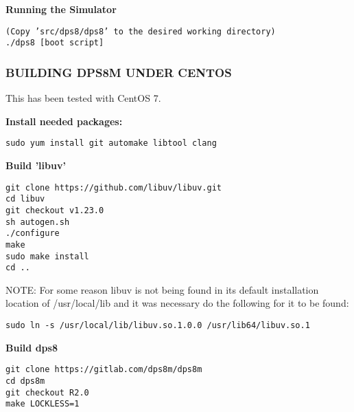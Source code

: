 \textbf{Running the Simulator}

\begin{adjustwidth}{5ex}{1ex}
    \texttt{(Copy 'src/dps8/dps8' to the desired working directory)} \\
    \texttt{./dps8 [boot script]} \\
\end{adjustwidth}  

\newpage

\subsubsection[Building dps8m under CentOS]{BUILDING DPS8M UNDER CENTOS}

This has been tested with CentOS 7.

\textbf{Install needed packages:}

\begin{adjustwidth}{5ex}{1ex}
	\texttt{sudo yum install git automake libtool clang} \\
\end{adjustwidth}  

\textbf{Build 'libuv'}

\begin{adjustwidth}{5ex}{1ex}
    \texttt{git clone https://github.com/libuv/libuv.git} \\
    \texttt{cd libuv} \\
    \texttt{git checkout v1.23.0} \\
    \texttt{sh autogen.sh} \\
    \texttt{./configure} \\
    \texttt{make} \\
    \texttt{sudo make install} \\
    \texttt{cd ..} \\
\end{adjustwidth}  

NOTE: For some reason libuv is not being found in its default installation location of /usr/local/lib and it was necessary do the following for it to be found:

\begin{adjustwidth}{5ex}{1ex}
    \texttt{sudo ln -s /usr/local/lib/libuv.so.1.0.0 /usr/lib64/libuv.so.1} \\
\end{adjustwidth}  

\textbf{Build dps8}

\begin{adjustwidth}{5ex}{1ex}
    \texttt{git clone https://gitlab.com/dps8m/dps8m} \\
    \texttt{cd dps8m} \\
    \texttt{git checkout R2.0} \\
    \texttt{make LOCKLESS=1} \\
\end{adjustwidth}  

